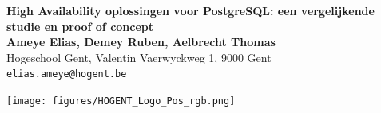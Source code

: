\documentclass[a0,portrait]{a0poster}
\begin{document}


\begin{minipage}[t]{0.75\linewidth}
\VeryHuge \color{HoGentAccent1} \textbf{High Availability oplossingen voor PostgreSQL: een vergelijkende studie en proof of concept} \color{Black}\\ %
\newline
\huge \textbf{Ameye Elias, Demey Ruben, Aelbrecht Thomas}\\[0.5cm] %
\huge Hogeschool Gent, Valentin Vaerwyckweg 1, 9000 Gent\\[0.4cm] %
\Large \texttt{elias.ameye@hogent.be} \\
\end{minipage}
%
\begin{minipage}[t]{0.25\linewidth}
\texttt{[image: figures/HOGENT\_Logo\_Pos\_rgb.png]} 

\end{minipage}

\vspace{1cm} %

\end{document}
